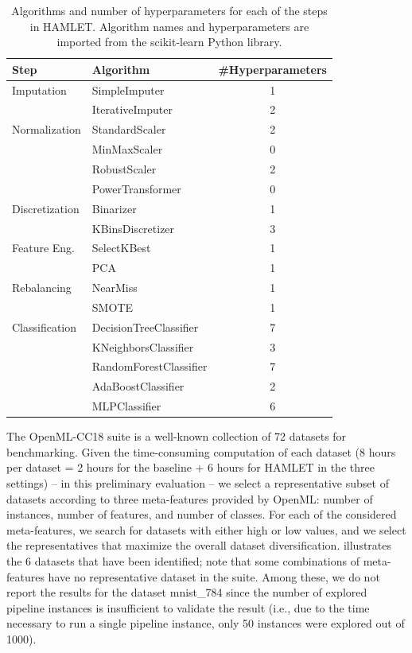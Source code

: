\begin{table}[t]
    \footnotesize
    \caption{Algorithms and number of hyperparameters for each of the steps in HAMLET. Algorithm names and hyperparameters are imported from the scikit-learn Python library.}
    \centering
    \begin{tabular}{llc}
        \toprule
        \textbf{Step} & \textbf{Algorithm} & \textbf{\#Hyperparameters}  \\\midrule
        Imputation        & SimpleImputer & 1 \\
                          & IterativeImputer & 2 \\
        Normalization     & StandardScaler & 2 \\
                          & MinMaxScaler & 0 \\
                          & RobustScaler & 2 \\
                          & PowerTransformer & 0 \\
        Discretization    & Binarizer & 1 \\
                          & KBinsDiscretizer & 3 \\
        Feature Eng.      & SelectKBest & 1 \\
                          & PCA & 1 \\
        Rebalancing       & NearMiss & 1 \\
                          & SMOTE & 1 \\
        Classification    & DecisionTreeClassifier & 7 \\
                          & KNeighborsClassifier & 3 \\
                          & RandomForestClassifier & 7 \\
                          & AdaBoostClassifier & 2 \\
                          & MLPClassifier & 6 \\ \bottomrule
    \end{tabular}
    \label{tab:search_space}
\end{table}

The OpenML-CC18 suite is a well-known collection of 72 datasets for benchmarking.
Given the time-consuming computation of each dataset (8 hours per dataset = 2 hours for the baseline + 6 hours for HAMLET in the three settings) -- in this preliminary evaluation -- we select a representative subset of datasets according to three meta-features provided by OpenML: number of instances, number of features, and number of classes.
For each of the considered meta-features, we search for datasets with either high or low values, and we select the representatives that maximize the overall dataset diversification.
 illustrates the 6 datasets that have been identified; note that some combinations of meta-features have no representative dataset in the suite.
Among these, we do not report the results for the dataset mnist\_784 since the number of explored pipeline instances is insufficient to validate the result (i.e., due to the time necessary to run a single pipeline instance, only 50 instances were explored out of 1000).

